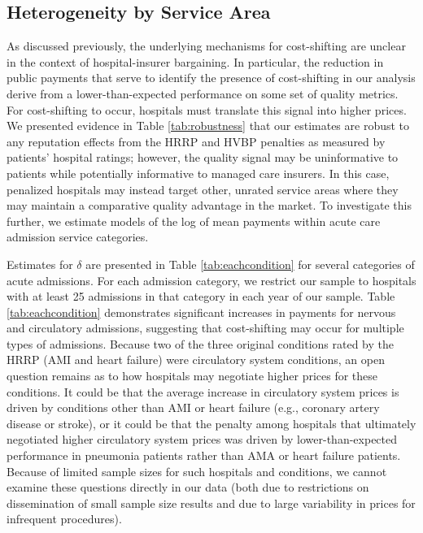 \documentclass[12pt]{article}
\begin{document}
\subsection{Heterogeneity by Service Area}
As discussed previously, the underlying mechanisms for cost-shifting are unclear in the context of hospital-insurer bargaining. In particular, the reduction in public payments that serve to identify the presence of cost-shifting in our analysis derive from a lower-than-expected performance on some set of quality metrics. For cost-shifting to occur, hospitals must translate this signal into higher prices. We presented evidence in Table \ref{tab:robustness} that our estimates are robust to any reputation effects from the HRRP and HVBP penalties as measured by patients' hospital ratings; however, the quality signal may be uninformative to patients while potentially informative to managed care insurers. In this case, penalized hospitals may instead target other, unrated service areas where they may maintain a comparative quality advantage in the market. To investigate this further, we estimate models of the log of mean payments within acute care admission service categories.

Estimates for $\delta$ are presented in Table \ref{tab:eachcondition} for several categories of acute admissions. For each admission category, we restrict our sample to hospitals with at least 25 admissions in that category in each year of our sample. Table \ref{tab:eachcondition} demonstrates significant increases in payments for nervous and circulatory admissions, suggesting that cost-shifting may occur for multiple types of admissions. Because two of the three original conditions rated by the HRRP (AMI and heart failure) were circulatory system conditions, an open question remains as to how hospitals may negotiate higher prices for these conditions. It could be that the average increase in circulatory system prices is driven by conditions other than AMI or heart failure (e.g., coronary artery disease or stroke), or it could be that the penalty among hospitals that ultimately negotiated higher circulatory system prices was driven by lower-than-expected performance in pneumonia patients rather than AMA or heart failure patients. Because of limited sample sizes for such hospitals and conditions, we cannot examine these questions directly in our data (both due to restrictions on dissemination of small sample size results and due to large variability in prices for infrequent procedures).
\end{document}
